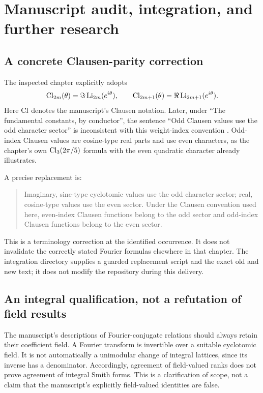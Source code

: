 \section{Manuscript audit, integration, and further research}
\label{ir:sec:audit}

\subsection{A concrete Clausen-parity correction}
The inspected chapter
 explicitly adopts
\[
 \operatorname{Cl}_{2m}(\theta)=\Im\operatorname{Li}_{2m}(e^{i\theta}),\qquad
 \operatorname{Cl}_{2m+1}(\theta)=\Re\operatorname{Li}_{2m+1}(e^{i\theta}).
\]
Here $\operatorname{Cl}$ denotes the manuscript's Clausen notation.
Later, under ``The fundamental constants, by conductor'', the sentence
``Odd Clausen values use the odd character sector'' is inconsistent
with this weight-index convention \cite{repo}. Odd-index Clausen values
are cosine-type real parts and use even characters, as the chapter's
own $\operatorname{Cl}_3(2\pi/5)$ formula with the even quadratic character already
illustrates.

A precise replacement is:
\begin{quote}
Imaginary, sine-type cyclotomic values use the odd character sector;
real, cosine-type values use the even sector. Under the Clausen
convention used here, even-index Clausen functions belong to the odd
sector and odd-index Clausen functions belong to the even sector.
\end{quote}
This is a terminology correction at the identified occurrence. It does
not invalidate the correctly stated Fourier formulas elsewhere in that
chapter. The integration directory supplies a guarded replacement script
and the exact old and new text; it does not modify the repository during
this delivery.

\subsection{An integral qualification, not a refutation of field results}
The manuscript's descriptions of Fourier-conjugate relations should
always retain their coefficient field. A Fourier transform is invertible
over a suitable cyclotomic field. It is not automatically a unimodular
change of integral lattices, since its inverse has a denominator.
Accordingly, agreement of field-valued ranks does not prove agreement of
integral Smith forms. This is a clarification of scope, not a claim
that the manuscript's explicitly field-valued identities are false.

